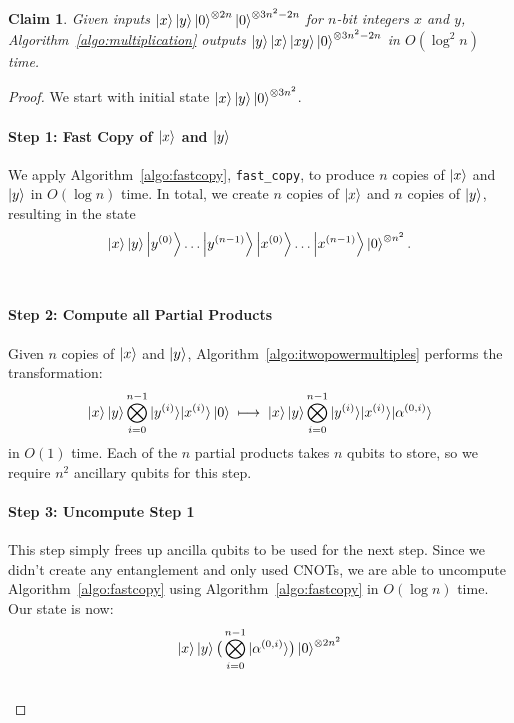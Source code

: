\documentclass[reprint,amsmath,amssymb,aps,pra]{revtex4-2}
\newtheorem{claim}{Claim}
\newcommand{\smallket}[1]{{|{#1}\rangle}}
\begin{document}
\begin{claim}
    Given inputs $\ket{x}\ket{y}\ket{0}^{\otimes 2n}\ket{0}^{\otimes 3n^2-2n}$ for $n$-bit integers $x$ and $y$, Algorithm~\ref{algo:multiplication} outputs  $\ket{y}\ket{x}\ket{xy}\ket{0}^{\otimes 3n^2-2n}$ in $O(\log^2n)$ time. 
\end{claim}
\begin{proof}
    We start with initial state $\ket{x}\ket{y}\ket{0}^{\otimes 3n^2}$. \\
    
    \paragraph{Step 1: Fast Copy of $\ket{x}$ and $\ket{y}$}
    We apply Algorithm~\ref{algo:fastcopy}, \texttt{fast\_copy}, to produce $n$ copies of $\ket{x}$ and $\ket{y}$ in $O(\log n)$ time. In total, we create $n$ copies of $\ket{x}$ and $n$ copies of $\ket{y}$, resulting in the state
    \begin{align}
    \ket{x}\ket{y}\ket{y^{(0)}}\dots\ket{y^{(n-1)}}\ket{x^{(0)}}\dots\ket{x^{(n-1)}}\ket{0}^{\otimes n^2} .
    \end{align}\\   

    \paragraph{Step 2: Compute all Partial Products}
    Given $n$ copies of $\ket{x}$ and $\ket{y}$, Algorithm~\ref{algo:itwopowermultiples} performs the transformation:
    \begin{align}
        \ket{x}\ket{y}\bigotimes_{i=0}^{n-1}\smallket{y^{(i)}}\smallket{x^{(i)}}\ket{0}
        \;\longmapsto\;
        \ket{x}\ket{y}\bigotimes_{i=0}^{n-1}\smallket{y^{(i)}}\smallket{x^{(i)}}\smallket{\alpha^{(0,i)}}    
    \end{align}
    in $O(1)$ time. Each of the $n$ partial products takes $n$ qubits to store, so we require $n^2$ ancillary qubits for this step.\\
    
    \paragraph{Step 3: Uncompute Step 1}
    This step simply frees up ancilla qubits to be used for the next step. Since we didn't create any entanglement and only used CNOTs, we are able to uncompute Algorithm~\ref{algo:fastcopy} using Algorithm~\ref{algo:fastcopy} in $O(\log{n})$ time. Our state is now:
    \begin{align}
        \ket{x}\ket{y}\big(\bigotimes_{i=0}^{n-1}\smallket{\alpha^{(0,i)}}\big)\ket{0}^{\otimes 2n^2} 
    \end{align}\\


\end{proof}
\end{document}
